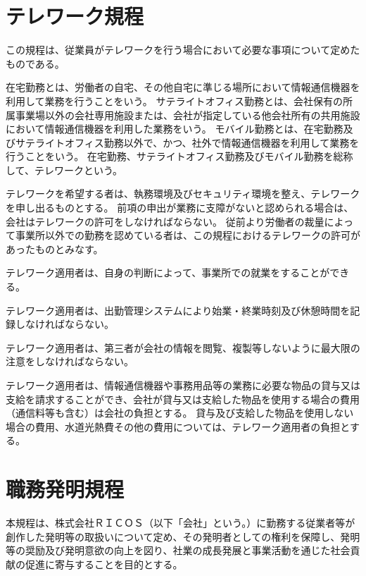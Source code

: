 \documentclass[10pt,a4paper,uplatex]{jsarticle}
\begin{document}
\clearpage
\section{テレワーク規程}

この規程は、従業員がテレワークを行う場合において必要な事項について定めたものである。

在宅勤務とは、労働者の自宅、その他自宅に準じる場所において情報通信機器を利用して業務を行うことをいう。
\term サテライトオフィス勤務とは、会社保有の所属事業場以外の会社専用施設または、会社が指定している他会社所有の共用施設において情報通信機器を利用した業務をいう。
\term モバイル勤務とは、在宅勤務及びサテライトオフィス勤務以外で、かつ、社外で情報通信機器を利用して業務を行うことをいう。
\term 在宅勤務、サテライトオフィス勤務及びモバイル勤務を総称して、テレワークという。

テレワークを希望する者は、執務環境及びセキュリティ環境を整え、テレワークを申し出るものとする。
\term 前項の申出が業務に支障がないと認められる場合は、会社はテレワークの許可をしなければならない。
\term 従前より労働者の裁量によって事業所以外での勤務を認めている者は、この規程におけるテレワークの許可があったものとみなす。

テレワーク適用者は、自身の判断によって、事業所での就業をすることができる。

テレワーク適用者は、出勤管理システムにより始業・終業時刻及び休憩時間を記録しなければならない。

テレワーク適用者は、第三者が会社の情報を閲覧、複製等しないように最大限の注意をしなければならない。

テレワーク適用者は、情報通信機器や事務用品等の業務に必要な物品の貸与又は支給を請求することができ、会社が貸与又は支給した物品を使用する場合の費用（通信料等も含む）は会社の負担とする。
\term 貸与及び支給した物品を使用しない場合の費用、水道光熱費その他の費用については、テレワーク適用者の負担とする。

\clearpage
\section{職務発明規程}

本規程は、株式会社ＲＩＣＯＳ（以下「会社」という。）に勤務する従業者等が創作した発明等の取扱いについて定め、その発明者としての権利を保障し、発明等の奨励及び発明意欲の向上を図り、社業の成長発展と事業活動を通じた社会貢献の促進に寄与することを目的とする。
\end{document}

